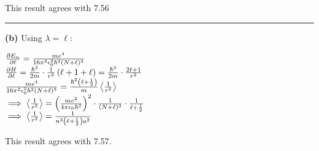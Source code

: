 \documentclass[14pt]{extarticle}
\makeatletter
\newenvironment{lefteqs}{%
    \begin{flushleft}%
    \renewcommand{\arraystretch}{1.3}%
    $\begin{array}{@{}l@{}}%
}{%
    \end{array}$%
    \end{flushleft}%
}
\makeatother
\begin{document}
This result agrees with 7.56

\vspace{3em}
\hrule
\vspace{2em}

\textbf{(b)}
Using $\lambda = \ell$:

\begin{lefteqs}
    \frac{\partial E_n}{\partial \ell} = \frac{m e^4}{16 \pi^2 \epsilon_0^2 \hbar^2 (N + \ell)^3} \\
    \frac{\partial H}{\partial \ell} = \frac{\hbar^2}{2m} \cdot \frac{1}{r^2} \left( \ell + 1 + \ell \right) = \frac{\hbar^2}{2m} \cdot \frac{2\ell + 1}{r^2} \\
    \frac{m e^4}{16 \pi^2 \epsilon_0^2 \hbar^2 (N + \ell)^3} = \frac{\hbar^2 \left( \ell + \frac{1}{2} \right)}{m} \left\langle \frac{1}{r^2} \right\rangle \\
    \implies \left\langle \frac{1}{r^2} \right\rangle = \left( \frac{m e^2}{4 \pi \epsilon_0 \hbar^2} \right)^2 \cdot \frac{1}{(N + \ell)^3} \cdot \frac{1}{\ell + \frac{1}{2}} \\
    \implies \left\langle \frac{1}{r^2} \right\rangle = \frac{1}{n^3 \left( \ell + \frac{1}{2} \right) a^2}
\end{lefteqs}

This result agrees with 7.57.
\end{document}
